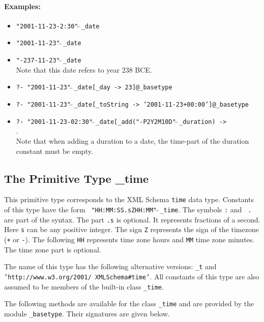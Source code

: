 \documentclass[11pt]{article}
\begin{document}
\paragraph{Examples:}
\begin{itemize}
  \item {\tt "2001-11-23-2:30"$\hat{~}\hat{~}$\_date} 
  \item {\tt "2001-11-23"$\hat{~}\hat{~}$\_date}  
  \item {\tt "-237-11-23"$\hat{~}\hat{~}$\_date}\\
    Note that this date refers to year 238 BCE.
  \item {\tt ?- "2001-11-23"$\hat{~}\hat{~}$\_date[\_day -> 23]@\_basetype}  
  \item {\tt ?- "2001-11-23"$\hat{~}\hat{~}$\_date[\_toString ->
      '2001-11-23+00:00']@\_basetype}  
  \item {\tt ?- "2001-11-23-02:30"$\hat{~}\hat{~}$\_date[\_add("-P2Y2M10D"$\hat{~}\hat{~}$\_duration) ->}\\
  \hspace*{7cm}{\tt
    "1979-09-13-02:30"$\hat{~}\hat{~}$\_dt]@\_basetype}.\\
  Note that when adding a duration to a date, the time-part of the duration
  constant must be empty.
\end{itemize}

\subsection{ The Primitive Type \_time}

This primitive type corresponds to the XML Schema {\tt time} data type.
Constants of this type have the form {\tt
  "HH:MM:SS.sZHH:MM"$\hat{~}\hat{~}$\_time}.  The symbols {\tt :} and {\tt
  .}  are part of the syntax. The part {\tt .s} is optional. It represents
fractions of a second. Here {\tt s} can be any positive integer. The sign
{\tt Z} represents the sign of the timezone ({\tt +} or {\tt -}). The
following {\tt HH} represents time zone hours and {\tt MM} time zone
minutes. The time zone part is optional.


The name of this type has the following alternative versions:
{\tt \_t} and  {\tt 'http://www.w3.org/2001/ XMLSchema\#time'}. 
All constants of this type are also assumed to be members of the built-in
class {\tt \_time}. 

The following methods are available for the class {\tt \_time} and are
provided by the module {\tt \_basetype}.  Their signatures are given below.
\end{document}

